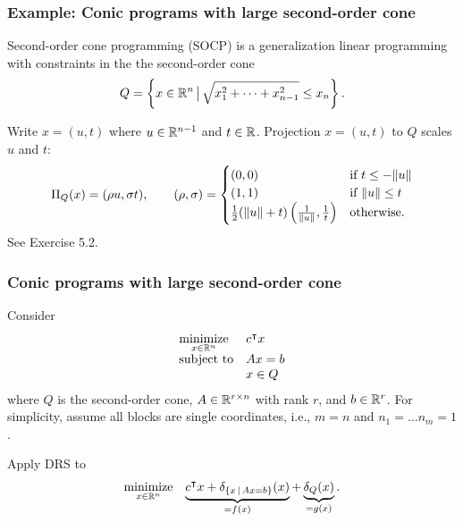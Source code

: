 \documentclass[10pt,mathserif]{beamer}
\begin{document}
\begin{frame}
\frametitle{Example: Conic programs with large second-order cone}
Second-order cone programming (SOCP) is a generalization linear programming with constraints in the the second-order cone
\[
Q
=
\left\{
x\in \mathbb{R}^{n}\,\big|\,
\sqrt{x_1^2+\dots+x_{n-1}^2}\le x_n
\right\}.
\]

Write $x=(u,t)$ where $u\in \mathbb{R}^{n-1}$ and $t\in\mathbb{R}$.
Projection $x=(u,t)$ to $Q$ scales $u$ and $t$:
\[
\Pi_{Q}(x)=(\rho u,\sigma t),\qquad
\left(\rho,\sigma\right)  =\begin{cases}
                               (0,0) & \mbox{if } t \le -\|u\| \\
                               (1,1) & \mbox{if }   \|u\|\le t\\
                         \frac{1}{2}(\|u\|+t)\left(\frac{1}{\|u\|},\frac{1}{t}\right) & \mbox{otherwise}.
                \end{cases}
\]
See Exercise 5.2.
\end{frame}


\begin{frame}
\frametitle{Conic programs with large second-order cone}
Consider 
\begin{align*}
\begin{array}{ll}
\underset{x\in\mathbb{R}^n}{\mbox{minimize}} & c^\intercal x \\
\mbox{subject to}& Ax = b\\
  & x\in Q
  \end{array}
\end{align*}
where $Q$ is the second-order cone, $A\in \mathbb{R}^{r\times n}$ with rank $r$, and $b\in\mathbb{R}^r$.
For simplicity, assume all blocks are single coordinates, i.e., $m=n$ and $n_1=\dots n_m=1$.
\medskip

Apply DRS to
\begin{align*}
\begin{array}{ll}
\underset{x\in\mathbb{R}^n}{\mbox{minimize}} & 
\underbrace{c^\intercal x + \delta_{\{x\,|\,Ax=b\}}(x)}_{=f(x)}+
\underbrace{\delta_{ Q}(x)}_{=g(x)}.
  \end{array}
\end{align*}

\end{frame}
\end{document}

